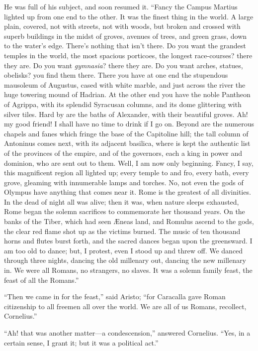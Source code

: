 He was full of his subject, and soon resumed it. ``Fancy the
Campus Martius lighted up from one end to the other. It was the finest
thing in the world. A large plain, covered, not with streets, not with
woods, but broken and crossed with superb buildings in the midst of
groves, avenues of trees, and green grass, down to the water's edge.
There's nothing that isn't there. Do you want the grandest temples
in the world, the most spacious porticoes, the longest race-courses?
there they are. Do you want \emph{gymnasia}? there they are. Do you
want arches, statues, obelisks? you find them there. There you have at
one end the stupendous mausoleum of Augustus, cased with white marble,
and just across the river the huge towering mound of Hadrian. At the
other end you have the noble Pantheon of Agrippa, with its splendid
Syracusan columns, and its dome glittering with silver tiles. Hard by
are the baths of Alexander, with their beautiful groves. Ah! my good
friend! I shall have no time to drink if I go on. Beyond are the
numerous chapels and fanes which fringe the base of the Capitoline
hill; the tall column of Antoninus comes next, with its adjacent
basilica, where is kept the authentic list of the provinces of the
empire, and of the governors, each a king in power and dominion, who
are sent out to them. Well, I am now only beginning. Fancy, I say,
this magnificent region all lighted up; every temple to and fro,
every bath, every grove, gleaming with innumerable lamps and torches.
No, not even the gods of Olympus have anything that comes near it.
Rome is the greatest of all divinities. In the dead of night all was
alive; then it was, when nature sleeps exhausted, Rome began the
solemn sacrifices to commemorate her thousand years. On the banks of
the Tiber, which had seen Æneas land, and Romulus ascend to the gods,
the clear red flame shot up as the victims burned. The music of ten
thousand horns and flutes burst forth, and the sacred dances began
upon the greensward. I am too old to dance; but, I protest, even I
stood up and threw off. We danced through three nights, dancing the
old millenary out, dancing the new millenary in. We were all Romans,
no strangers, no slaves. It was a solemn family feast, the feast of
all the Romans.''

``Then we came in for the feast,'' said Aristo; ``for
Caracalla gave Roman citizenship to all freemen all over the world. We
are all of us Romans, recollect, Cornelius.''

``Ah! that was another matter—a condescension,'' answered
Cornelius. ``Yes, in a certain sense, I grant it; but it was a
political act.''

